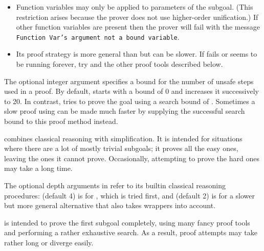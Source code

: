 \begin{isabellebody}
\begin{isamarkuptext}
\begin{description}
\begin{itemize}
  \item Function variables may only be applied to parameters of the
  subgoal.  (This restriction arises because the prover does not use
  higher-order unification.)  If other function variables are present
  then the prover will fail with the message \texttt{Function Var's
  argument not a bound variable}.

  \item Its proof strategy is more general than \hyperlink{method.fast}{\mbox{}} but can
  be slower.  If \hyperlink{method.blast}{\mbox{}} fails or seems to be running forever,
  try \hyperlink{method.fast}{\mbox{}} and the other proof tools described below.

  \end{itemize}

  The optional integer argument specifies a bound for the number of
  unsafe steps used in a proof.  By default, \hyperlink{method.blast}{\mbox{}} starts
  with a bound of 0 and increases it successively to 20.  In contrast,
   tries to prove the goal using a search bound
  of .  Sometimes a slow proof using \hyperlink{method.blast}{\mbox{}} can
  be made much faster by supplying the successful search bound to this
  proof method instead.

  \item \hyperlink{method.auto}{\mbox{}} combines classical reasoning with
  simplification.  It is intended for situations where there are a lot
  of mostly trivial subgoals; it proves all the easy ones, leaving the
  ones it cannot prove.  Occasionally, attempting to prove the hard
  ones may take a long time.

  The optional depth arguments in  refer to its
  builtin classical reasoning procedures:  (default 4) is for
  \hyperlink{method.blast}{\mbox{}}, which is tried first, and  (default 2) is
  for a slower but more general alternative that also takes wrappers
  into account.

  \item \hyperlink{method.force}{\mbox{}} is intended to prove the first subgoal
  completely, using many fancy proof tools and performing a rather
  exhaustive search.  As a result, proof attempts may take rather long
  or diverge easily.


\end{description}
\end{isamarkuptext}
\end{isabellebody}
